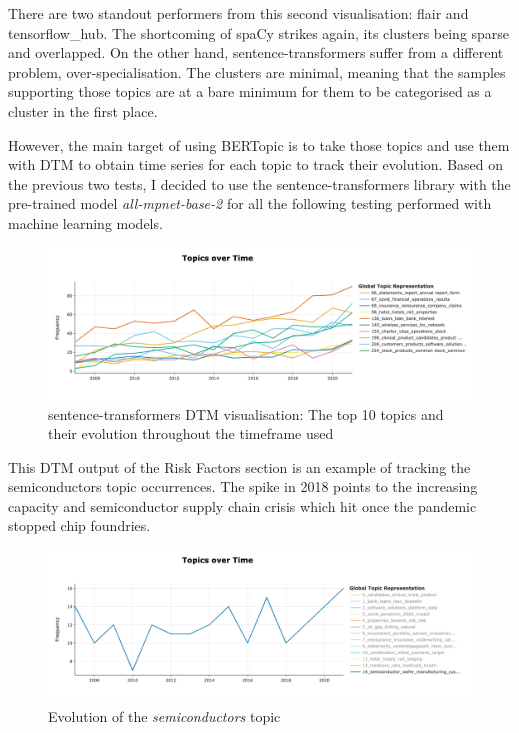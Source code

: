 \documentclass[12pt,MSc,a4paper,oneside]{muthesis}
\begin{document}
There are two standout performers from this second visualisation: flair and tensorflow\_hub. The shortcoming of spaCy strikes again, its clusters being sparse and overlapped. On the other hand, sentence-transformers suffer from a different problem, over-specialisation. The clusters are minimal, meaning that the samples supporting those topics are at a bare minimum for them to be categorised as a cluster in the first place.

However, the main target of using BERTopic is to take those topics and use them with DTM to obtain time series for each topic to track their evolution. Based on the previous two tests, I decided to use the sentence-transformers library with the pre-trained model \textit{all-mpnet-base-2} for all the following testing performed with machine learning models. 

\begin{figure}[h]
    \centering
    \includegraphics[scale=0.4]{results/tot_longesst_sentence.png}
    \caption{sentence-transformers DTM visualisation: The top 10 topics and their evolution throughout the timeframe used}
\end{figure}

This DTM output of the Risk Factors section is an example of tracking the semiconductors topic occurrences. The spike in 2018 points to the increasing capacity and semiconductor supply chain crisis which hit once the pandemic stopped chip foundries.

\begin{figure}[h]
    \centering
    \includegraphics[scale=0.3]{results/topic_evolution_example.png}
    \caption{Evolution of the \textit{semiconductors} topic}
\end{figure}
\end{document}
